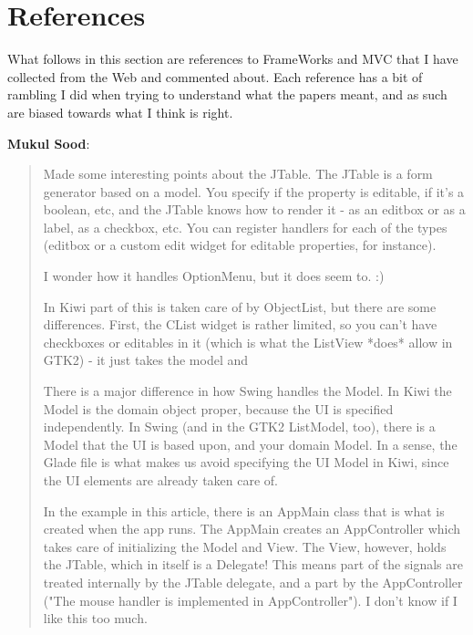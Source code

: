 \documentclass[a4paper]{howto}
\begin{document}
\section{References}

What follows in this section are references to FrameWorks and MVC that I
have collected from the Web and commented about. Each reference has a
bit of rambling I did when trying to understand what the papers meant,
and as such are biased towards what I think is right.

{\bf Mukul Sood}:

\begin{quotation}

    Made some interesting points about the JTable. The JTable is a form
    generator based on a model. You specify if the property is editable,
    if it's a boolean, etc, and the JTable knows how to render it - as
    an editbox or as a label, as a checkbox, etc. You can register
    handlers for each of the types (editbox or a custom edit widget for
    editable properties, for instance).

    I wonder how it handles OptionMenu, but it does seem to. :)

    In Kiwi part of this is taken care of by ObjectList, but there
    are some differences. First, the CList widget is rather limited, so
    you can't have checkboxes or editables in it (which is what the
    ListView *does* allow in GTK2) - it just takes the model and

    There is a major difference in how Swing handles the Model. In Kiwi
    the Model is the domain object proper, because the UI is specified
    independently. In Swing (and in the GTK2 ListModel, too), there is a
    Model that the UI is based upon, and your domain Model. In a sense,
    the Glade file is what makes us avoid specifying the UI Model in
    Kiwi, since the UI elements are already taken care of.

    In the example in this article, there is an AppMain class that is
    what is created when the app runs. The AppMain creates an
    AppController which takes care of initializing the Model and View.
    The View, however, holds the JTable, which in itself is a Delegate!
    This means part of the signals are treated internally by the JTable
    delegate, and a part by the AppController ("The mouse handler is
    implemented in AppController"). I don't know if I like this too
    much.

\end{quotation}
\end{document}
